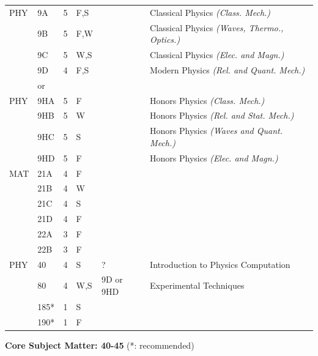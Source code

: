 \documentclass[12pt]{article}
\begin{document}
\noindent
\begin{tabular}{|llllll|}
\hline
PHY & 9A & 5 & F,S & & Classical Physics {\it (Class. Mech.)}\\ 
    & 9B & 5 & F,W & & Classical Physics {\it (Waves, Thermo., Optics.)}\\ 
    & 9C & 5 & W,S & & Classical Physics {\it (Elec. and Magn.)}\\ 
    & 9D & 4 & F,S & & Modern Physics {\it (Rel. and Quant. Mech.)}\\ 
\hline
&or&&\\
\hline
PHY & 9HA & 5 & F & & Honors Physics {\it (Class. Mech.)}\\ 
    & 9HB & 5 & W & & Honors Physics {\it (Rel. and Stat. Mech.)}\\ 
    & 9HC & 5 & S & & Honors Physics {\it (Waves and Quant. Mech.)}\\ 
    & 9HD & 5 & F & & Honors Physics {\it (Elec. and Magn.)}\\ 
\hline
\hline
MAT & 21A & 4 & F & &\\ 
    & 21B & 4 & W & &\\ 
    & 21C & 4 & S & &\\ 
    & 21D & 4 & F & &\\ 
    & 22A & 3 & F & &\\ 
    & 22B & 3 & F & &\\ 
PHY & 40  & 4 & S & ? & Introduction to Physics Computation \\ 
    & 80  & 4 & W,S & 9D or 9HD & Experimental Techniques \\ 
    & 185* & 1 & S & & \\ 
    & 190* & 1 & F & & \\ 
\hline
\end{tabular}

\vskip 0.5cm
\noindent
{\bf Core Subject Matter: 40-45} (*: recommended)\\ \vskip -0.25cm
\end{document}
